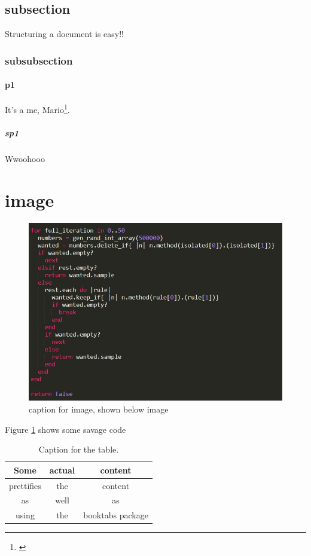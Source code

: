 \documentclass{article}
\begin{document}
\subsection{subsection}
Structuring a document is easy!! \cite{near2012rubicon}
\subsubsection{subsubsection}
\paragraph{p1}
It's a me, Mario\footnote{\label{myfootnote}\cite{near2012rubicon}}.
\subparagraph{sp1}
Wwoohooo
\section{image}
\begin{figure}
\includegraphics[width=\linewidth]{screenshots/code-gen-int-pre_divisible_keep_if}
\caption{caption for image, shown below image}
\label{fig:code1}
\end{figure}
Figure \ref{fig:code1} shows some savage code

	
\begin{table}[h!]
\centering
\caption{Caption for the table.}
\label{tab:table1}
\begin{tabular}{ccc}
\toprule
Some & actual & content\\
\midrule
prettifies & the & content\\
as & well & as\\
using & the & booktabs package\\
\bottomrule
\end{tabular}
\end{table}



\end{document}
